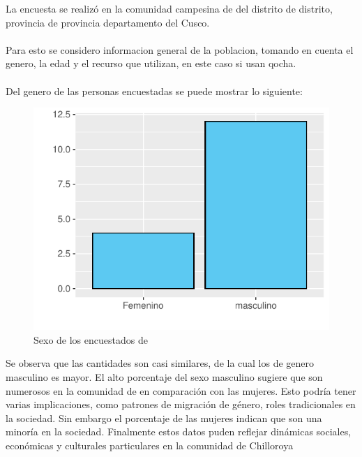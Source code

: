 \documentclass[12pt]{article}\usepackage[]{graphicx}\usepackage[]{xcolor}
\makeatletter
\def\maxwidth{ %
  \ifdim\Gin@nat@width>\linewidth
    \linewidth
  \else
    \Gin@nat@width
  \fi
}
\newenvironment{knitrout}{}{} %
\makeatother
\begin{document}

\tableofcontents
\newpage
\listoftables
\newpage
\listoffigures
\newpage
	La encuesta se realizó en la comunidad campesina de \comunidad\- del distrito de distrito, provincia de provincia departamento del Cusco.\\
	\\
	Para esto se considero informacion general de la poblacion, tomando en cuenta el genero, la edad y el recurso que utilizan, en este caso si usan qocha.\\
	\\
	Del genero de las personas encuestadas se puede mostrar lo siguiente:
	\begin{figure}[H]
	\centering
\begin{knitrout}
\color{fgcolor}
\includegraphics[width=\maxwidth]{figure/uno-1} 
\end{knitrout}
	\caption{Sexo de los encuestados de \comunidad}
	\end{figure}
	Se observa que las cantidades son casi similares, de la cual los de genero masculino es mayor. El alto porcentaje del sexo masculino sugiere que son numerosos en la comunidad de \comunidad en comparación con las mujeres. Esto podría tener varias implicaciones, como patrones de migración de género, roles tradicionales en la sociedad. Sin embargo el porcentaje de las mujeres indican que son una minoría en la sociedad. Finalmente estos datos puden reflejar dinámicas sociales, económicas y culturales particulares en la comunidad de Chilloroya
\end{document}
